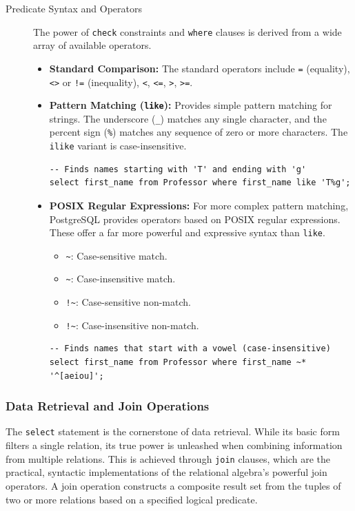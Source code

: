 \begin{description}
    \item[Predicate Syntax and Operators] The power of \texttt{check} constraints and \texttt{where} clauses is derived from a wide array of available operators.
    \begin{itemize}
        \item \textbf{Standard Comparison:} The standard operators include \texttt{=} (equality), \texttt{<>} or \texttt{!=} (inequality), \texttt{<}, \texttt{<=}, \texttt{>}, \texttt{>=}.
        \item \textbf{Pattern Matching (\texttt{like}):} Provides simple pattern matching for strings. The underscore (\texttt{\_}) matches any single character, and the percent sign (\texttt{\%}) matches any sequence of zero or more characters. The \texttt{ilike} variant is case-insensitive.
        \begin{verbatim}
-- Finds names starting with 'T' and ending with 'g'
select first_name from Professor where first_name like 'T%g';
        \end{verbatim}
        \item \textbf{POSIX Regular Expressions:} For more complex pattern matching, PostgreSQL provides operators based on POSIX regular expressions. These offer a far more powerful and expressive syntax than \texttt{like}.
        \begin{itemize}
            \item \texttt{\~}: Case-sensitive match.
            \item \texttt{\~\*}: Case-insensitive match.
            \item \texttt{!\~}: Case-sensitive non-match.
            \item \texttt{!\~\*}: Case-insensitive non-match.
        \end{itemize}
        \begin{verbatim}
-- Finds names that start with a vowel (case-insensitive)
select first_name from Professor where first_name ~* '^[aeiou]';
        \end{verbatim}
    \end{itemize}
\end{description}

\subsubsection{Data Retrieval and Join Operations}
The \texttt{select} statement is the cornerstone of data retrieval. While its basic form filters a single relation, its true power is unleashed when combining information from multiple relations. This is achieved through \texttt{join} clauses, which are the practical, syntactic implementations of the relational algebra's powerful join operators. A join operation constructs a composite result set from the tuples of two or more relations based on a specified logical predicate.

